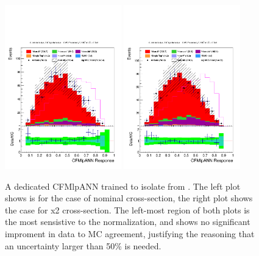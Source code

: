 \begin{description}
    \begin{figure}[hbtp]
 \begin{center}
   \includegraphics[width=0.45\textwidth]{Figures/Analysis_1_Diagrams/d2MCPlots_CFMlpANN_cut2_6JIncl_3TIncl_Combined_HtWgt_ttlf_ttbb_nominal.pdf}
   \includegraphics[width=0.45\textwidth]{Figures/Analysis_1_Diagrams/d2MCPlots_CFMlpANN_cut2_6JIncl_3TIncl_Combined_topPagCSV_ttlf_ttbb_x2ttbbXS.pdf}
   \caption{A dedicated CFMlpANN trained to isolate \ttbb from
     \ttjets.  The left plot shows is for the case of nominal \ttbb
     cross-section, the right plot shows the case for x2 \ttbb
     cross-section.  The left-most region of both plots is the most
     sensistive to the \ttbb normalization, and shows no significant
     improment in data to MC agreement, justifying the reasoning that
     an uncertainty larger than 50\% is needed.}
   \label{fig:ttbb_ttlf_disc}
 \end{center}
\end{figure}


\end{description}
